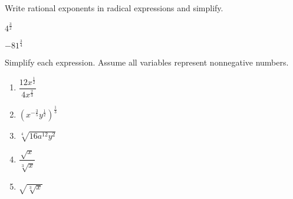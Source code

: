 \begin{exercise}Write rational exponents in radical expressions and simplify.
\\
\begin{enumerate*}[label={(\arabic*)~}]
\item $4^{\frac32}$
\item $-81^{\frac 34}$\hfill\null
\end{enumerate*}
\end{exercise}
\vfill
\begin{center} \hfill
{}
\end{center}


\begin{exercise}Simplify each expression. Assume all variables represent nonnegative numbers. 
\begin{enumerate}[label={(\arabic*)~},itemsep=0.5in,itemindent=1ex]
\item $\dfrac{12x^{\frac12}}{4x^{\frac23}}$
\item $(x^{-\frac35}y^{\frac12})^{\frac13}$
\item $\sqrt[4]{16a^{12}y^2}$
\item $\dfrac{\sqrt{x}}{\sqrt[3]{x}}$
\item $\sqrt{\sqrt[3]{x}}$
\end{enumerate}
\end{exercise}

\vfill
\begin{center} \hfill
{}
\end{center}



